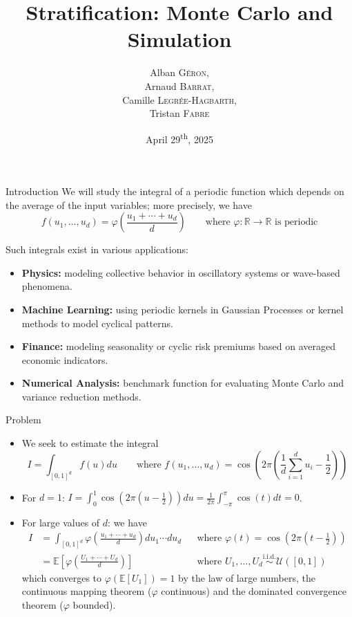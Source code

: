 \documentclass[aspectratio=169,xcolor=dvipsnames]{beamer}
\title{Stratification: Monte Carlo and Simulation}
\author{
    Alban \textsc{Géron}, \\
    Arnaud \textsc{Barrat}, \\
    Camille \textsc{Legrée-Hagbarth}, \\
    Tristan \textsc{Fabre}
}
\date{April 29\textsuperscript{th}, 2025}
\begin{document}
    \begin{frame}
        \titlepage
    \end{frame}

    \begin{frame}{Introduction}
        We will study the integral of a periodic function which depends on the average of the input variables; more precisely, we have
        \[f(u_1, \dots, u_d) = \varphi\left(\frac{u_1 + \cdots + u_d}{d}\right) \qquad \text{where } \varphi : \mathbb R \to \mathbb R \text{ is periodic}\]

        Such integrals exist in various applications: 
        \begin{itemize}
            \item \textbf{Physics:} modeling collective behavior in oscillatory systems or wave-based phenomena.
            \item \textbf{Machine Learning:} using periodic kernels in Gaussian Processes or kernel methods to model cyclical patterns.
            \item \textbf{Finance:} modeling seasonality or cyclic risk premiums based on averaged economic indicators.
            \item \textbf{Numerical Analysis:} benchmark function for evaluating Monte Carlo and variance reduction methods.
        \end{itemize}
        
    \end{frame}

    \begin{frame}{Problem}
        \begin{itemize}
            \item<1-> We seek to estimate the integral
            \[I = \int_{[0, 1]^d} f(u) du \qquad \text{where } f(u_1, \dots, u_d) = \cos\left(2 \pi \left(\frac{1}{d} \sum_{i = 1}^d u_i - \frac{1}{2}\right)\right)\]

            \item<2-> For $d = 1$: $I = \int_0^1 \cos\left(2 \pi \left(u - \frac{1}{2}\right)\right) du = \frac{1}{2\pi} \int_{-\pi}^\pi \cos(t) dt = 0$.

            \item<3-> For large values of $d$: we have
            \begin{align*}
                I &= \int_{[0, 1]^d} \varphi\left(\frac{u_1 + \cdots + u_d}{d}\right) du_1 \cdots du_d && \text{where } \varphi(t) = \cos\left(2 \pi \left(t - \frac{1}{2}\right)\right) \\
                &= \mathbb{E}\left[\varphi\left(\frac{U_1 + \cdots + U_d}{d}\right)\right] && \text{where } U_1, \dots, U_d \overset{\text{i.i.d.}}{\sim} \mathcal{U}([0, 1])
            \end{align*}
            which converges to $\varphi(\mathbb{E}[U_1]) = 1$ by the law of large numbers, the continuous mapping theorem ($\varphi$ continuous) and the dominated convergence theorem ($\varphi$ bounded).
        \end{itemize}
    \end{frame}
\end{document}
